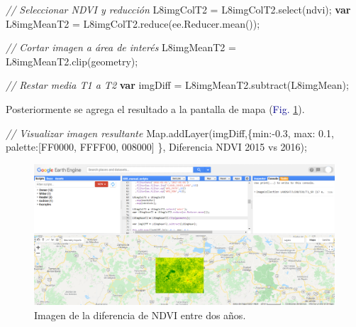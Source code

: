 \documentclass[
  12pt,
  letterpaper,
  twoside]{book}
\newenvironment{Shaded}{\begin{snugshade}}{\end{snugshade}}
\newcommand{\AttributeTok}[1]{\textcolor[rgb]{0.48,0.12,0.64}{#1}}
\newcommand{\CommentTok}[1]{\textcolor[rgb]{0.24,0.58,0.00}{\textit{#1}}}
\newcommand{\ControlFlowTok}[1]{\textcolor[rgb]{0.00,0.00,0.00}{\textbf{#1}}}
\newcommand{\DataTypeTok}[1]{\textcolor[rgb]{0.00,0.00,0.00}{#1}}
\newcommand{\FloatTok}[1]{\textcolor[rgb]{0.28,0.53,0.93}{#1}}
\newcommand{\FunctionTok}[1]{\textcolor[rgb]{0.48,0.12,0.64}{#1}}
\newcommand{\KeywordTok}[1]{\textcolor[rgb]{0.48,0.12,0.64}{#1}}
\newcommand{\NormalTok}[1]{#1}
\newcommand{\OperatorTok}[1]{\textcolor[rgb]{0.00,0.00,0.00}{#1}}
\newcommand{\StringTok}[1]{\textcolor[rgb]{0.87,0.29,0.22}{#1}}
\begin{document}
\begin{Shaded}
\begin{Highlighting}[]
\CommentTok{// Seleccionar NDVI y reducción}
\NormalTok{L8imgColT2 }\OperatorTok{=}\NormalTok{ L8imgColT2}\OperatorTok{.}\FunctionTok{select}\NormalTok{(}\StringTok{\textquotesingle{}ndvi\textquotesingle{}}\NormalTok{)}\OperatorTok{;}
\ControlFlowTok{var}\NormalTok{ L8imgMeanT2 }\OperatorTok{=}\NormalTok{ L8imgColT2}\OperatorTok{.}\FunctionTok{reduce}\NormalTok{(}\KeywordTok{ee}\OperatorTok{.}\AttributeTok{Reducer}\OperatorTok{.}\FunctionTok{mean}\NormalTok{())}\OperatorTok{;}

\CommentTok{// Cortar imagen a área de interés}
\NormalTok{L8imgMeanT2 }\OperatorTok{=}\NormalTok{ L8imgMeanT2}\OperatorTok{.}\FunctionTok{clip}\NormalTok{(geometry)}\OperatorTok{;}

\CommentTok{// Restar media T1 a T2}
\ControlFlowTok{var}\NormalTok{ imgDiff }\OperatorTok{=}\NormalTok{ L8imgMeanT2}\OperatorTok{.}\FunctionTok{subtract}\NormalTok{(L8imgMean)}\OperatorTok{;}  
\end{Highlighting}
\end{Shaded}

Posteriormente se agrega el resultado a la pantalla de mapa (\textcolor{darkblue}{Fig.} \ref{fig:f1023}).

\begin{Shaded}
\begin{Highlighting}[]
\CommentTok{// Visualizar imagen resultante}
\KeywordTok{Map}\OperatorTok{.}\FunctionTok{addLayer}\NormalTok{(imgDiff}\OperatorTok{,}\NormalTok{\{}\DataTypeTok{min}\OperatorTok{:{-}}\FloatTok{0.3}\OperatorTok{,} \DataTypeTok{max}\OperatorTok{:} \FloatTok{0.1}\OperatorTok{,} 
  \DataTypeTok{palette}\OperatorTok{:}\NormalTok{[}\StringTok{\textquotesingle{}FF0000\textquotesingle{}}\OperatorTok{,} \StringTok{\textquotesingle{}FFFF00\textquotesingle{}}\OperatorTok{,} \StringTok{\textquotesingle{}008000\textquotesingle{}}\NormalTok{] \}}\OperatorTok{,} 
  \StringTok{\textquotesingle{}Diferencia NDVI 2015 vs 2016\textquotesingle{}}\NormalTok{)}\OperatorTok{;}
\end{Highlighting}
\end{Shaded}

\begin{figure}[H]

{\centering \includegraphics[width=0.95\linewidth]{Img/imDifNDVI} 

}

\caption{Imagen de la diferencia de NDVI entre dos años.}\label{fig:f1023}
\end{figure}
\end{document}
